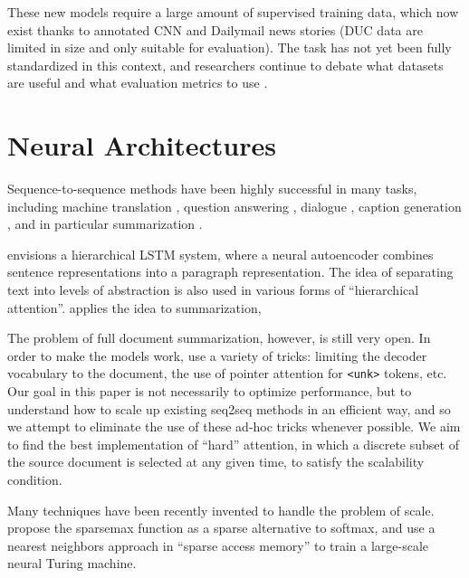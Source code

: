 \documentclass[11pt]{report}
\begin{document}
These new models require a large amount of supervised training data, which now exist thanks to annotated CNN and Dailymail news stories (DUC data are limited in size and only suitable for evaluation). The task has not yet been fully standardized in this context, and researchers continue to debate what datasets are useful and what evaluation metrics to use \citep{toutanova2016summarymetrics}. 

\section{Neural Architectures}

Sequence-to-sequence methods have been highly successful in many tasks, including machine translation \citep{sutskever2014sequence, bahdanau2014neural}, question answering \citep{hermann2015read}, dialogue \citep{li2016persona}, caption generation \citep{xu2015captioning}, and in particular summarization \citep{rush2015neural}.

\cite{li2015autoencoder} envisions a hierarchical LSTM system, where a neural autoencoder combines sentence representations into a paragraph representation. The idea of separating text into levels of abstraction is also used in various forms of ``hierarchical attention''.
\cite{nallapati2016seq2seq} applies the idea to summarization, 


The problem of full document summarization, however, is still very open. In order to make the models work, \cite{nallapati2016seq2seq} use a variety of tricks: limiting the decoder vocabulary to the document, the use of pointer attention for \texttt{<unk>} tokens, etc. Our goal in this paper is not necessarily to optimize performance, but to understand how to scale up existing seq2seq methods in an efficient way, and so we attempt to eliminate the use of these ad-hoc tricks whenever possible. We aim to find the best implementation of ``hard'' attention, in which a discrete subset of the source document is selected at any given time, to satisfy the scalability condition.



Many techniques have been recently invented to handle the problem of scale. \cite{martins2016sparsemax} propose the sparsemax function as a sparse alternative to softmax, and \cite{rae2016sparsememory} use a nearest neighbors approach in ``sparse access memory'' to train a large-scale neural Turing machine.

\end{document}
